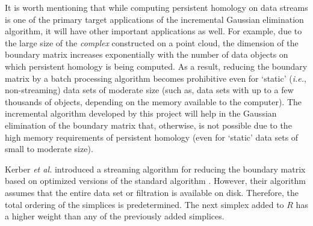 \documentclass[11pt]{article}
\begin{document}
It is worth mentioning that while computing persistent homology on data streams is one of the 
primary target applications of the incremental Gaussian elimination algorithm, it will have other 
important applications as well.  For example, due to the large size of the \emph{complex} 
constructed on a point cloud, the dimension of the boundary matrix increases exponentially with the 
number of data objects on which persistent homology is being computed.  As a result, reducing the 
boundary matrix by a batch processing algorithm becomes prohibitive even for `static' (\emph{i.e.}, 
non-streaming) data sets of moderate size (such as, data sets with up to a few thousands of 
objects, depending on the memory available to the computer).  The incremental algorithm developed 
by this project will help in the Gaussian elimination of the boundary matrix that, otherwise, is 
not possible due to the high memory requirements of persistent homology (even for `static' data 
sets of small to moderate size).


Kerber \textit{et al.} \cite{kerber-18} introduced a streaming algorithm for reducing the boundary 
matrix based on optimized versions of the standard algorithm \cite{edelsbrunner-00, 
zomorodian-05}.  However, their algorithm assumes that the entire data set or filtration is 
available on disk.  Therefore, the total ordering of the simplices is predetermined.  The next 
simplex added to $R$ has a higher weight than any of the previously added simplices.





\end{document}
